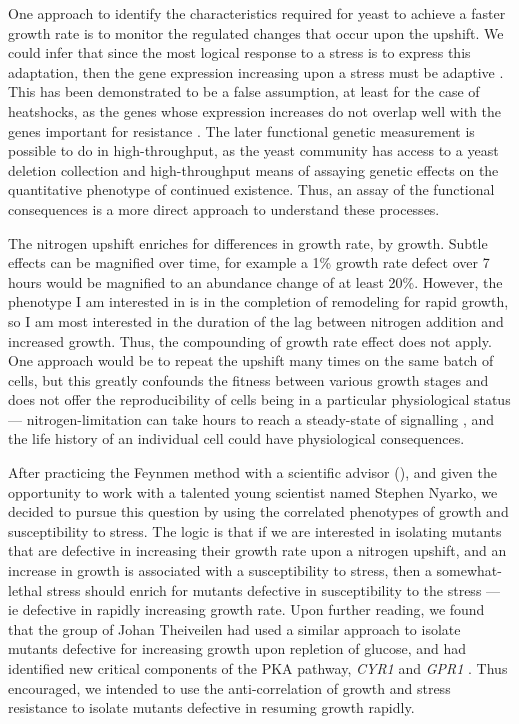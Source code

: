 One approach to identify the characteristics required for yeast to 
achieve a faster growth rate is to monitor the regulated changes that
occur upon the upshift. We could infer
that since the most logical response to a stress is to express this
adaptation, then the gene expression increasing upon a stress must be
adaptive \parencite{gould1979spandrels}. 
This has been demonstrated to be a false assumption, at least for the
case of heatshocks, as the genes whose expression increases do not 
overlap well with the
genes important for resistance \parencite{gibney2013yeast}.
The later functional genetic measurement is possible to do in 
high-throughput, as
the yeast community has access to a yeast deletion collection and
high-throughput means of assaying genetic effects on the quantitative
phenotype of continued existence. 
Thus, an assay of the functional consequences is a more direct
approach to understand these processes.

The nitrogen upshift enriches for %
differences in growth rate, by growth. 
Subtle effects can be magnified over time, for example a
1\% growth rate defect over 7 hours would be magnified to an abundance
change of at least 20\%. However, the phenotype I am interested in is
in the completion of remodeling for rapid growth, so I am most
interested in the duration of the lag between nitrogen addition and
increased growth. Thus, the compounding of growth rate effect does not 
apply. One approach would be to repeat the upshift many times on the
same batch of cells, but this greatly confounds the fitness between 
various growth stages and does not offer the reproducibility of cells
being in a particular physiological status --- nitrogen-limitation can
take hours to reach a steady-state of signalling
\parencite{tate2013five}, and the life history of an individual cell
could have physiological consequences.

After practicing the Feynmen method with a scientific advisor
(), and given
the opportunity to work with a talented young scientist named Stephen
Nyarko, we decided to pursue this question by using the correlated
phenotypes of growth and susceptibility to stress.
The logic is that if we are interested in isolating mutants that are
defective in increasing their growth rate upon a nitrogen upshift, and
an increase in growth is associated with a susceptibility to stress,
then a somewhat-lethal stress should enrich for mutants defective in
susceptibility to the stress --- ie defective in rapidly increasing 
growth rate.
Upon further reading, we found that the group of Johan Theiveilen had
used a similar approach to isolate mutants defective for increasing
growth upon repletion of glucose, and had identified new critical
components of the PKA pathway, \textit{CYR1} and \textit{GPR1}
\parencite{van2000characterization}.
Thus encouraged, we intended to use the anti-correlation of growth
and stress resistance to isolate mutants defective in resuming growth
rapidly.

